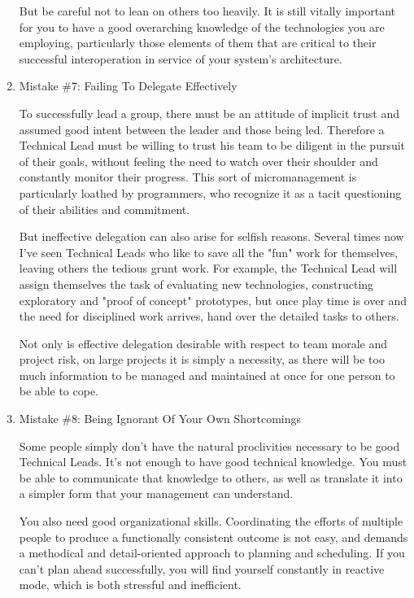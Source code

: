 \documentclass{article}
\begin{document}
\begin{enumerate}
But be careful not to lean on others too heavily. It is still vitally
important for you to have a good overarching knowledge of the
technologies you are employing, particularly those elements of them that
are critical to their successful interoperation in service of your
system's architecture.

\item Mistake \#7: Failing To Delegate Effectively
\label{sec:orgheadline150}

To successfully lead a group, there must be an attitude of implicit
trust and assumed good intent between the leader and those being led.
Therefore a Technical Lead must be willing to trust his team to be
diligent in the pursuit of their goals, without feeling the need to
watch over their shoulder and constantly monitor their progress. This
sort of micromanagement is particularly loathed by programmers, who
recognize it as a tacit questioning of their abilities and commitment.

But ineffective delegation can also arise for selfish reasons. Several
times now I've seen Technical Leads who like to save all the "fun" work
for themselves, leaving others the tedious grunt work. For example, the
Technical Lead will assign themselves the task of evaluating new
technologies, constructing exploratory and "proof of concept"
prototypes, but once play time is over and the need for disciplined work
arrives, hand over the detailed tasks to others.

Not only is effective delegation desirable with respect to team morale
and project risk, on large projects it is simply a necessity, as there
will be too much information to be managed and maintained at once for
one person to be able to cope.

\item Mistake \#8: Being Ignorant Of Your Own Shortcomings
\label{sec:orgheadline151}

Some people simply don't have the natural proclivities necessary to be
good Technical Leads. It's not enough to have good technical knowledge.
You must be able to communicate that knowledge to others, as well as
translate it into a simpler form that your management can understand.

You also need good organizational skills. Coordinating the efforts of
multiple people to produce a functionally consistent outcome is not
easy, and demands a methodical and detail-oriented approach to planning
and scheduling. If you can't plan ahead successfully, you will find
yourself constantly in reactive mode, which is both stressful and
inefficient.


\end{enumerate}
\end{document}
